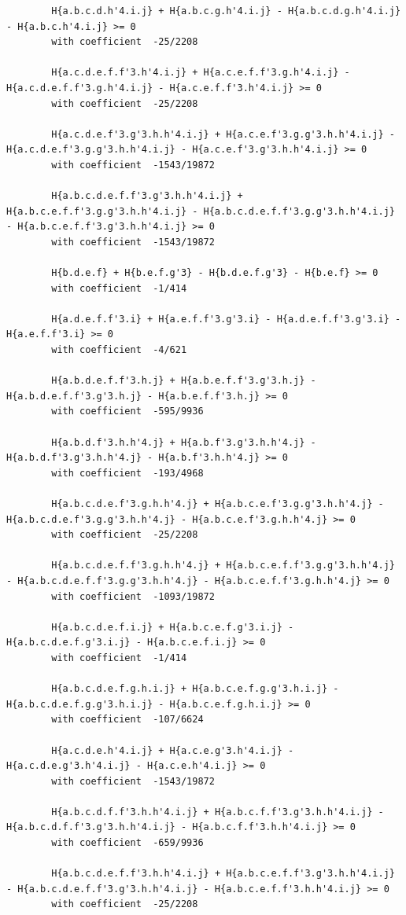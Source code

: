\documentclass[11pt, a4paper]{kybernetika}
\begin{document}
\begin{verbatim}
		H{a.b.c.d.h'4.i.j} + H{a.b.c.g.h'4.i.j} - H{a.b.c.d.g.h'4.i.j} - H{a.b.c.h'4.i.j} >= 0
		with coefficient  -25/2208
		
		H{a.c.d.e.f.f'3.h'4.i.j} + H{a.c.e.f.f'3.g.h'4.i.j} - H{a.c.d.e.f.f'3.g.h'4.i.j} - H{a.c.e.f.f'3.h'4.i.j} >= 0
		with coefficient  -25/2208
		
		H{a.c.d.e.f'3.g'3.h.h'4.i.j} + H{a.c.e.f'3.g.g'3.h.h'4.i.j} - H{a.c.d.e.f'3.g.g'3.h.h'4.i.j} - H{a.c.e.f'3.g'3.h.h'4.i.j} >= 0
		with coefficient  -1543/19872
		
		H{a.b.c.d.e.f.f'3.g'3.h.h'4.i.j} + H{a.b.c.e.f.f'3.g.g'3.h.h'4.i.j} - H{a.b.c.d.e.f.f'3.g.g'3.h.h'4.i.j} - H{a.b.c.e.f.f'3.g'3.h.h'4.i.j} >= 0
		with coefficient  -1543/19872
		
		H{b.d.e.f} + H{b.e.f.g'3} - H{b.d.e.f.g'3} - H{b.e.f} >= 0
		with coefficient  -1/414
		
		H{a.d.e.f.f'3.i} + H{a.e.f.f'3.g'3.i} - H{a.d.e.f.f'3.g'3.i} - H{a.e.f.f'3.i} >= 0
		with coefficient  -4/621
		
		H{a.b.d.e.f.f'3.h.j} + H{a.b.e.f.f'3.g'3.h.j} - H{a.b.d.e.f.f'3.g'3.h.j} - H{a.b.e.f.f'3.h.j} >= 0
		with coefficient  -595/9936
		
		H{a.b.d.f'3.h.h'4.j} + H{a.b.f'3.g'3.h.h'4.j} - H{a.b.d.f'3.g'3.h.h'4.j} - H{a.b.f'3.h.h'4.j} >= 0
		with coefficient  -193/4968
		
		H{a.b.c.d.e.f'3.g.h.h'4.j} + H{a.b.c.e.f'3.g.g'3.h.h'4.j} - H{a.b.c.d.e.f'3.g.g'3.h.h'4.j} - H{a.b.c.e.f'3.g.h.h'4.j} >= 0
		with coefficient  -25/2208
		
		H{a.b.c.d.e.f.f'3.g.h.h'4.j} + H{a.b.c.e.f.f'3.g.g'3.h.h'4.j} - H{a.b.c.d.e.f.f'3.g.g'3.h.h'4.j} - H{a.b.c.e.f.f'3.g.h.h'4.j} >= 0
		with coefficient  -1093/19872
		
		H{a.b.c.d.e.f.i.j} + H{a.b.c.e.f.g'3.i.j} - H{a.b.c.d.e.f.g'3.i.j} - H{a.b.c.e.f.i.j} >= 0
		with coefficient  -1/414
		
		H{a.b.c.d.e.f.g.h.i.j} + H{a.b.c.e.f.g.g'3.h.i.j} - H{a.b.c.d.e.f.g.g'3.h.i.j} - H{a.b.c.e.f.g.h.i.j} >= 0
		with coefficient  -107/6624
		
		H{a.c.d.e.h'4.i.j} + H{a.c.e.g'3.h'4.i.j} - H{a.c.d.e.g'3.h'4.i.j} - H{a.c.e.h'4.i.j} >= 0
		with coefficient  -1543/19872
		
		H{a.b.c.d.f.f'3.h.h'4.i.j} + H{a.b.c.f.f'3.g'3.h.h'4.i.j} - H{a.b.c.d.f.f'3.g'3.h.h'4.i.j} - H{a.b.c.f.f'3.h.h'4.i.j} >= 0
		with coefficient  -659/9936
		
		H{a.b.c.d.e.f.f'3.h.h'4.i.j} + H{a.b.c.e.f.f'3.g'3.h.h'4.i.j} - H{a.b.c.d.e.f.f'3.g'3.h.h'4.i.j} - H{a.b.c.e.f.f'3.h.h'4.i.j} >= 0
		with coefficient  -25/2208
		

\end{verbatim}
\end{document}
